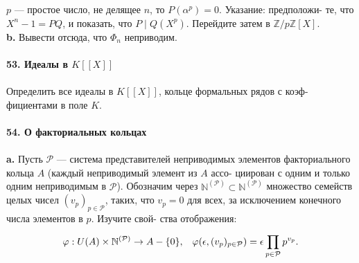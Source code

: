\documentclass{mai_book}
\begin{document}
$p$ — простое число, не делящее $n$, то $P (\alpha^p)=0$. Указание: предположи-\linebreak
те, что $X^n -1=PQ$, и показать, что $P\;|\;Q(X^p)$. Перейдите затем в\linebreak
$\mathbb{Z}/p\mathbb{Z}[X]$.\\
\hspace*{10pt}\textbf{b.} Вывести отсюда, что $\Phi_n$ неприводим.
\\
\\
\noindent\textbf{53. Идеалы в $K[[X]]$}\\\\
\hspace*{10pt} Определить все идеалы в $K[[X]]$, кольце формальных рядов с коэф-\linebreak
фициентами в поле $K$.
\\
\\
\noindent\textbf{54. О факториальных кольцах}\\\\
\hspace*{10pt}\textbf{a.} Пусть $\mathcal{P}$ — система представителей неприводимых элементов\linebreak
факториального кольца $A$ (каждый неприводимый элемент из $A$ ассо-\linebreak
циирован с одним и только одним неприводимым в $\mathcal{P}$). Обозначим через\linebreak
$\mathbb{N}^{(\mathcal{P})}\subset \mathbb{N}^{(\mathcal{P})}$ множество семейств целых чисел $(v_p)_{p\in\mathcal{P}}$, таких, что $v_p= 0$\linebreak
для всех, за исключением конечного числа элементов в $p$. Изучите свой-\linebreak
ства отображения:
\begin{equation*}
\varphi: U(A)\times \mathbb{N}^{(\mathcal{P})}\rightarrow A-\{0\},\;\;\;\varphi(\epsilon,(v_p)_{p\in \mathcal{P}})=\epsilon\prod_{p\in \mathcal{P}}^ {}p^{v_p}.\pagebreak
\end{equation*}

\end{document}
